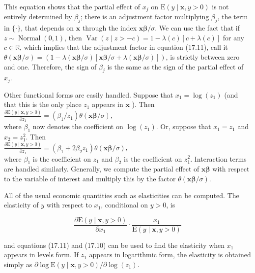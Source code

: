 \documentclass[10pt]{article}
\begin{document}
This equation shows that the partial effect of $x_{j}$ on $\mathrm{E}(y \mid \mathbf{x}, y>0)$ is not entirely determined by $\beta_{j}$; there is an adjustment factor multiplying $\beta_{j}$, the term in $\{\cdot\}$, that depends on $\mathbf{x}$ through the index $\mathbf{x} \boldsymbol{\beta} / \sigma$. We can use the fact that if $z \sim \operatorname{Normal}(0,1)$, then $\operatorname{Var}(z \mid z>-c)=1-\lambda(c)[c+\lambda(c)]$ for any $c \in \mathbb{R}$, which implies that the adjustment factor in equation (17.11), call it $\theta(\mathbf{x} \boldsymbol{\beta} / \sigma)=(1-\lambda(\mathbf{x} \boldsymbol{\beta} / \sigma)[\mathbf{x} \boldsymbol{\beta} / \sigma+\lambda(\mathbf{x} \boldsymbol{\beta} / \sigma)])$, is strictly between zero and one. Therefore, the sign of $\beta_{j}$ is the same as the sign of the partial effect of $x_{j}$.

Other functional forms are easily handled. Suppose that $x_{1}=\log \left(z_{1}\right)$ (and that this is the only place $z_{1}$ appears in $\mathbf{x}$ ). Then\\
$\frac{\partial \mathrm{E}(y \mid \mathbf{x}, y>0)}{\partial z_{1}}=\left(\beta_{1} / z_{1}\right) \theta(\mathbf{x} \boldsymbol{\beta} / \sigma)$,\\
where $\beta_{1}$ now denotes the coefficient on $\log \left(z_{1}\right)$. Or, suppose that $x_{1}=z_{1}$ and $x_{2}=z_{1}^{2}$. Then\\
$\frac{\partial \mathrm{E}(y \mid \mathbf{x}, y>0)}{\partial z_{1}}=\left(\beta_{1}+2 \beta_{2} z_{1}\right) \theta(\mathbf{x} \boldsymbol{\beta} / \sigma)$,\\
where $\beta_{1}$ is the coefficient on $z_{1}$ and $\beta_{2}$ is the coefficient on $z_{1}^{2}$. Interaction terms are handled similarly. Generally, we compute the partial effect of $\mathbf{x} \boldsymbol{\beta}$ with respect to the variable of interest and multiply this by the factor $\theta(\mathbf{x} \boldsymbol{\beta} / \sigma)$.

All of the usual economic quantities such as elasticities can be computed. The elasticity of $y$ with respect to $x_{1}$, conditional on $y>0$, is


\begin{equation*}
\frac{\partial \mathrm{E}(y \mid \mathbf{x}, y>0)}{\partial x_{1}} \cdot \frac{x_{1}}{\mathrm{E}(y \mid \mathbf{x}, y>0)} \tag{17.13}
\end{equation*}


and equations (17.11) and (17.10) can be used to find the elasticity when $x_{1}$ appears in levels form. If $z_{1}$ appears in logarithmic form, the elasticity is obtained simply as $\partial \log \mathrm{E}(y \mid \mathbf{x}, y>0) / \partial \log \left(z_{1}\right)$.
\end{document}
